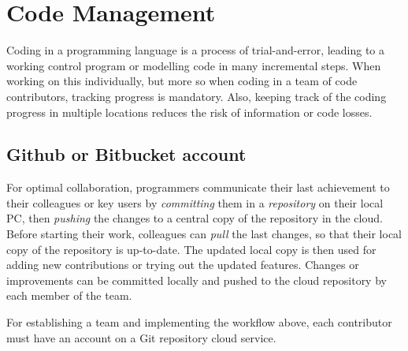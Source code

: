 \section{Code Management}
\label{app:firstApp}

Coding in a programming language is a process of trial-and-error, leading to a working control program or modelling code in many incremental steps. When working on this individually, but more so when coding in a team of code contributors, tracking progress is mandatory. Also, keeping track of the coding progress in multiple locations reduces the risk of information or code losses.

\subsection{Github or Bitbucket account}
\label{appendix::account}

For optimal collaboration, programmers communicate their last achievement to their colleagues or key users by \textit{committing} them in a \textit{repository} on their local PC, then \textit{pushing} the changes to a central copy of the repository in the cloud. Before starting their work, colleagues can \textit{pull} the last changes, so that their local copy of the repository is up-to-date. The updated local copy is then used for adding new contributions or trying out the updated features. Changes or improvements can be committed locally and pushed to the cloud repository by each member of the team.

For establishing a team and implementing the workflow above, each contributor must have an account on a Git repository cloud service.

